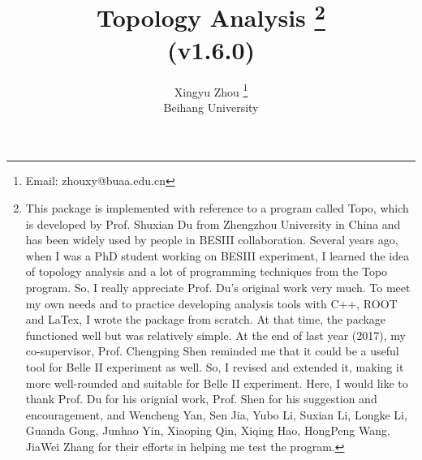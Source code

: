 \documentclass[landscape]{article}
\begin{document}
\title{Topology Analysis \footnote{\normalsize{This package is implemented with reference to a program called {\sc Topo}, which is developed by Prof. Shuxian Du from Zhengzhou University in China and has been widely used by people in BESIII collaboration. Several years ago, when I was a PhD student working on BESIII experiment, I learned the idea of topology analysis and a lot of programming techniques from the {\sc Topo} program. So, I really appreciate Prof. Du's original work very much. To meet my own needs and to practice developing analysis tools with C++, ROOT and LaTex, I wrote the package from scratch. At that time, the package functioned well but was relatively simple. At the end of last year (2017), my co-supervisor, Prof. Chengping Shen reminded me that it could be a useful tool for Belle II experiment as well. So, I revised and extended it, making it more well-rounded and suitable for Belle II experiment. Here, I would like to thank Prof. Du for his orignial work, Prof. Shen for his suggestion and encouragement, and Wencheng Yan, Sen Jia, Yubo Li, Suxian Li, Longke Li, Guanda Gong, Junhao Yin, Xiaoping Qin, Xiqing Hao, HongPeng Wang, JiaWei Zhang for their efforts in helping me test the program.}} \\ \vspace{0.1cm} \Large{(v1.6.0)}}
\author{Xingyu Zhou \footnote{\normalsize{Email: zhouxy@buaa.edu.cn}} \\ \vspace{0.1cm} Beihang University}
\maketitle

\clearpage


\listoftables


\clearpage
\end{document}
